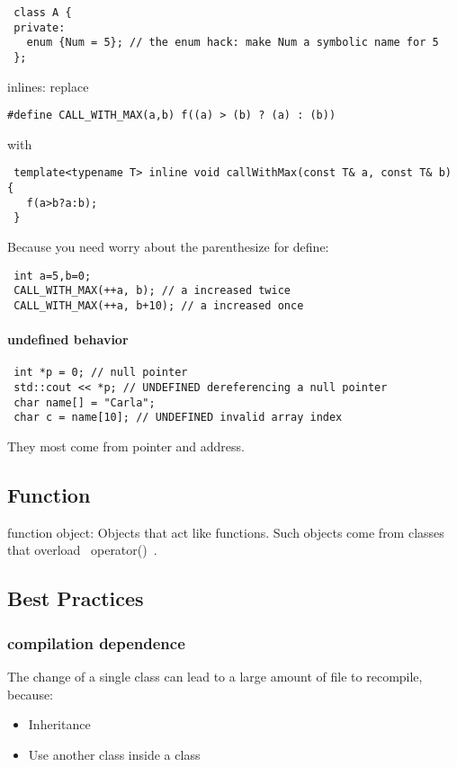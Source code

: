 \begin{lstlisting}
 class A {
 private:
   enum {Num = 5}; // the enum hack: make Num a symbolic name for 5
 };
\end{lstlisting}
inlines: replace

\begin{lstlisting}
#define CALL_WITH_MAX(a,b) f((a) > (b) ? (a) : (b))
\end{lstlisting}

with
\begin{lstlisting}
 template<typename T> inline void callWithMax(const T& a, const T& b) {
   f(a>b?a:b);
 }
\end{lstlisting}

Because you need worry about the parenthesize for define:

\begin{lstlisting}
 int a=5,b=0;
 CALL_WITH_MAX(++a, b); // a increased twice
 CALL_WITH_MAX(++a, b+10); // a increased once
\end{lstlisting}

\paragraph{undefined behavior}
\begin{lstlisting}
 int *p = 0; // null pointer
 std::cout << *p; // UNDEFINED dereferencing a null pointer
 char name[] = "Carla";
 char c = name[10]; // UNDEFINED invalid array index
\end{lstlisting}
They most come from pointer and address.
 \subsection{Function}
function object: Objects that act like functions.  Such objects come
from classes that overload ~operator()~.






 


\subsection{Best Practices}
\subsubsection{compilation dependence}

 The change of a single class can lead to a large amount of file to recompile,
 because:
\begin{itemize}
\item Inheritance
\item Use another class inside a class
\end{itemize}

